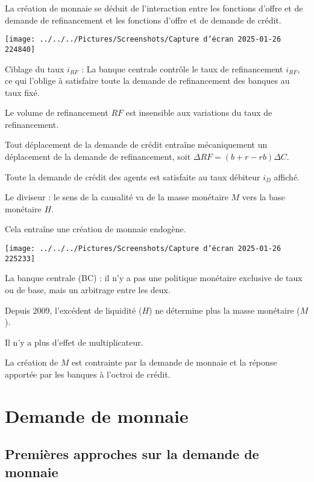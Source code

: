 \documentclass[a4paper, 12pt]{report}
\begin{document}
La création de monnaie se déduit de l'interaction entre les fonctions d'offre et de demande de refinancement et les fonctions d'offre et de demande de crédit.

	
\begin{center}
	\texttt{[image: ../../../Pictures/Screenshots/Capture d'écran 2025-01-26 224840]}
\end{center}

Ciblage du taux \( i_{RF} \) : La banque centrale contrôle le taux de refinancement \( i_{RF} \), ce qui l'oblige à satisfaire toute la demande de refinancement des banques au taux fixé.  

Le volume de refinancement \( RF \) est insensible aux variations du taux de refinancement.  

Tout déplacement de la demande de crédit entraîne mécaniquement un déplacement de la demande de refinancement, soit \( \Delta RF = (b+r-rb) \Delta C \).  

Toute la demande de crédit des agents est satisfaite au taux débiteur \( i_D \) affiché.  

Le diviseur : le sens de la causalité va de la masse monétaire \( M \) vers la base monétaire \( H \).  

Cela entraîne une création de monnaie endogène.

\begin{center}
	\texttt{[image: ../../../Pictures/Screenshots/Capture d'écran 2025-01-26 225233]}
\end{center}
	
La banque centrale (BC) : il n'y a pas une politique monétaire exclusive de taux ou de base, mais un arbitrage entre les deux.  

Depuis 2009, l'excédent de liquidité (\( H \)) ne détermine plus la masse monétaire (\( M \)).  

Il n'y a plus d'effet de multiplicateur.  

La création de \( M \) est contrainte par la demande de monnaie et la réponse apportée par les banques à l'octroi de crédit.
	
\section{Demande de monnaie}	
	
\subsection{Premières approches sur la demande de monnaie}
	
\end{document}
